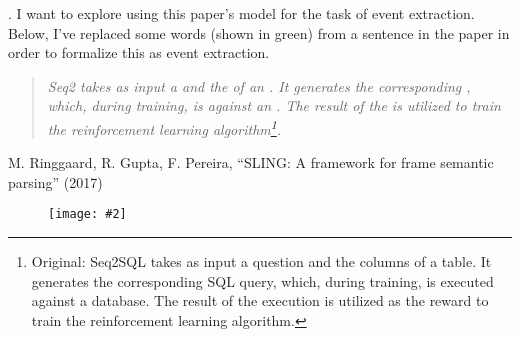 \documentclass[11pt]{article}
\newcommand\myfig[2][0.3\textwidth]{\begin{figure}[h!]\centering\texttt{[image: \#2]}\end{figure}}
\newcommand\myspace[1][]{\vspace{#1\bigskipamount}}
\newcommand\p{\Needspace{10\baselineskip} \noindent}
\begin{document}
\myspace
\p {}. I want to explore using this paper's model for the task of event extraction. Below, I've replaced some words (shown in green) from a sentence in the paper in order to formalize this as event extraction.
\begin{quote}
	{
		\itshape Seq2 takes as input a  and the  of an . It generates the corresponding , which, during training, is  against an . The result of the  is utilized to train the reinforcement learning algorithm\footnote{Original: Seq2SQL takes as input a question and the columns of a table. It generates the corresponding SQL query, which, during training, is executed against a database. The result of the execution is utilized as the reward to train the reinforcement learning algorithm.}.
	}
\end{quote}






\vspace{-1em}
{\footnotesize M. Ringgaard, R. Gupta, F. Pereira, ``SLING: A framework for frame semantic parsing'' (2017)}

\myfig[0.6\textwidth]{sling.png}
\end{document}
